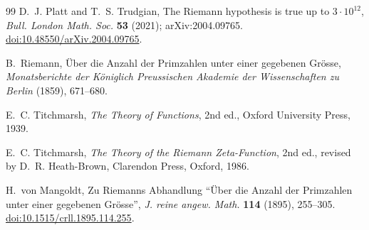 \documentclass[11pt,reqno]{amsart}
\numberwithin{equation}{section}
\theoremstyle{plain}
\theoremstyle{definition}
\theoremstyle{remark}
\begin{document}
\begin{thebibliography}{99}
D.~J. Platt and T.~S. Trudgian, The Riemann hypothesis is true up to $3\cdot10^{12}$, \emph{Bull. London Math. Soc.} \textbf{53} (2021); arXiv:2004.09765.
\href{https://doi.org/10.48550/arXiv.2004.09765}{doi:10.48550/arXiv.2004.09765}.

B.~Riemann, \"Uber die Anzahl der Primzahlen unter einer gegebenen Gr\"osse, \emph{Monatsberichte der K\"oniglich Preussischen Akademie der Wissenschaften zu Berlin} (1859), 671--680.

E.~C. Titchmarsh, \emph{The Theory of Functions}, 2nd ed., Oxford University Press, 1939.

E.~C. Titchmarsh, \emph{The Theory of the Riemann Zeta-Function}, 2nd ed., revised by D.~R. Heath-Brown, Clarendon Press, Oxford, 1986.

H.~von Mangoldt, Zu Riemanns Abhandlung ``\"Uber die Anzahl der Primzahlen unter einer gegebenen Gr\"osse'', \emph{J. reine angew. Math.} \textbf{114} (1895), 255--305.
\href{https://doi.org/10.1515/crll.1895.114.255}{doi:10.1515/crll.1895.114.255}.

\end{thebibliography}
\end{document}
